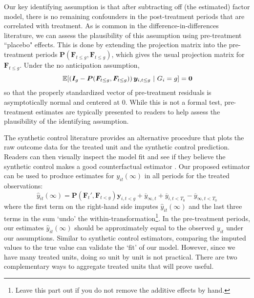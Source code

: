 \documentclass[12pt]{article}
\begin{document}
\begin{remark}\label{remark:assessing_assumptions}

Our key identifying assumption is that after subtracting off (the estimated) factor model, there is no remaining confounders in the post-treatment periods that are correlated with treatment. As is common in the difference-in-differences literature, we can assess the plausibility of this assumption using pre-treatment ``placebo" effects. This is done by extending the projection matrix into the pre-treatment periods $\bm P(\bm{F}_{t \leq g}, \bm{F}_{t \leq g})$, which gives the usual projection matrix for $\bm F_{t \leq g}$. Under the no anticipation assumption, 
\begin{equation}
  \expec{ \left( \bm I_{g} - \bm P(\bm{F}_{t \leq g}, \bm{F}_{t \leq g}) \right) \bm y_{i, t \leq g}}{G_i = g} = \bm 0
\end{equation}
so that the properly standardized vector of pre-treatment residuals is asymptotically normal and centered at 0. While this is not a formal test, pre-treatment estimates are typically presented to readers to help assess the plausibility of the identifying assumption.

The synthetic control literature provides an alternative procedure that plots the raw outcome data for the treated unit and the synthetic control prediction. Readers can then visually inspect the model fit and see if they believe the synthetic control makes a good counterfactual estimator \citep{abadie2021using}. Our proposed estimator can be used to produce estimates for $y_{it}(\infty)$ in all periods for the treated observations:
\begin{equation}
  \hat{y}_{it}(\infty) = \bm P(\bm{F}_t', \bm{F}_{t < g}) \bm y_{i, t<g} + \overline{y}_{\infty, t} + \overline{y}_{i, t<T_0} - \overline{y}_{\infty, t<T_0}
\end{equation}
where the first term on the right-hand side imputes $\hat{y}_{it}(\infty)$ and the last three terms in the sum `undo' the within-transformation\footnote{Leave this part out if you do not remove the additive effects by hand.}. In the pre-treatment periods, our estimates $\hat{y}_{it}(\infty)$ should be approximately equal to the observed $y_{it}$ under our assumptions. Similar to synthetic control estimators, comparing the imputed values to the true value can validate the `fit' of our model. However, since we have many treated units, doing so unit by unit is not practical. There are two complementary ways to aggregate treated units that will prove useful. 


\end{remark}
\end{document}
